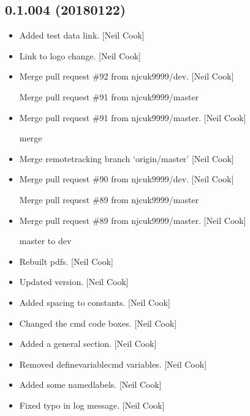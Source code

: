 \documentclass[a4paper,10pt,english]{report}
\begin{document}
\subsection{0.1.004 (2018\sphinxhyphen{}01\sphinxhyphen{}22)}
\label{\detokenize{misc/changelog:id519}}\begin{itemize}
\item {} 
Added test data link. {[}Neil Cook{]}

\item {} 
Link to logo change. {[}Neil Cook{]}

\item {} 
Merge pull request \#92 from njcuk9999/dev. {[}Neil Cook{]}

Merge pull request \#91 from njcuk9999/master

\item {} 
Merge pull request \#91 from njcuk9999/master. {[}Neil Cook{]}

merge

\item {} 
Merge remote\sphinxhyphen{}tracking branch ‘origin/master’ {[}Neil Cook{]}

\item {} 
Merge pull request \#90 from njcuk9999/dev. {[}Neil Cook{]}

Merge pull request \#89 from njcuk9999/master

\item {} 
Merge pull request \#89 from njcuk9999/master. {[}Neil Cook{]}

master to dev

\item {} 
Rebuilt pdfs. {[}Neil Cook{]}

\item {} 
Updated version. {[}Neil Cook{]}

\item {} 
Added spacing to constants. {[}Neil Cook{]}

\item {} 
Changed the cmd code boxes. {[}Neil Cook{]}

\item {} 
Added a general section. {[}Neil Cook{]}

\item {} 
Removed definevariablecmd variables. {[}Neil Cook{]}

\item {} 
Added some namedlabels. {[}Neil Cook{]}

\item {} 
Fixed typo in log message. {[}Neil Cook{]}


\end{itemize}
\end{document}
